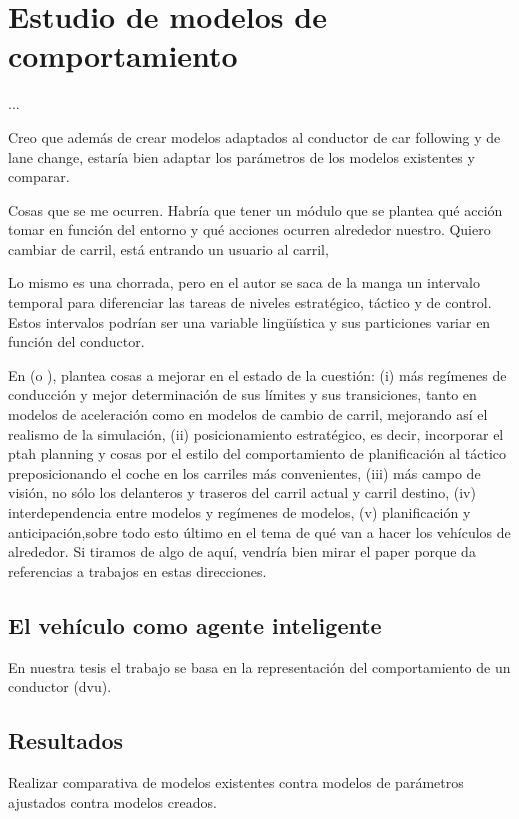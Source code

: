 \chapter{Estudio de modelos de comportamiento}
\label{ch:behavior-models-study}

...

Creo que además de crear modelos adaptados al conductor de car following y de lane change, estaría bien adaptar los parámetros de los modelos existentes y comparar.

Cosas que se me ocurren. Habría que tener un módulo que se plantea qué acción tomar en función del entorno y qué acciones ocurren alrededor nuestro. Quiero cambiar de carril, está entrando un usuario al carril,

Lo mismo es una chorrada, pero en \cite{Alexiadis2004} el autor se saca de la manga un intervalo temporal para diferenciar las tareas de niveles estratégico, táctico y de control. Estos intervalos podrían ser una variable lingüística y sus particiones variar en función del conductor.

En \cite{Toledo2007} (o \cite{Toledo2007-3}), plantea cosas a mejorar en el estado de la cuestión: (i) más regímenes de conducción y mejor determinación de sus límites y sus transiciones, tanto en modelos de aceleración como en modelos de cambio de carril, mejorando así el realismo de la simulación, (ii) posicionamiento estratégico, es decir, incorporar el ptah planning y cosas por el estilo del comportamiento de planificación al táctico preposicionando el coche en los carriles más convenientes, (iii) más campo de visión, no sólo los delanteros y traseros del carril actual y carril destino, (iv) interdependencia entre modelos y regímenes de modelos, (v) planificación y anticipación,sobre todo esto último en el tema de qué van a hacer los vehículos de alrededor. Si tiramos de algo de aquí, vendría bien mirar el paper porque da referencias a trabajos en estas direcciones.

\section{El vehículo como agente inteligente}

En nuestra tesis el trabajo se basa en la representación del comportamiento de un conductor (\gls{dvu}).

\section{Resultados}
\label{ch:behavior-models-study:results}

Realizar comparativa de modelos existentes contra modelos de parámetros ajustados contra modelos creados.